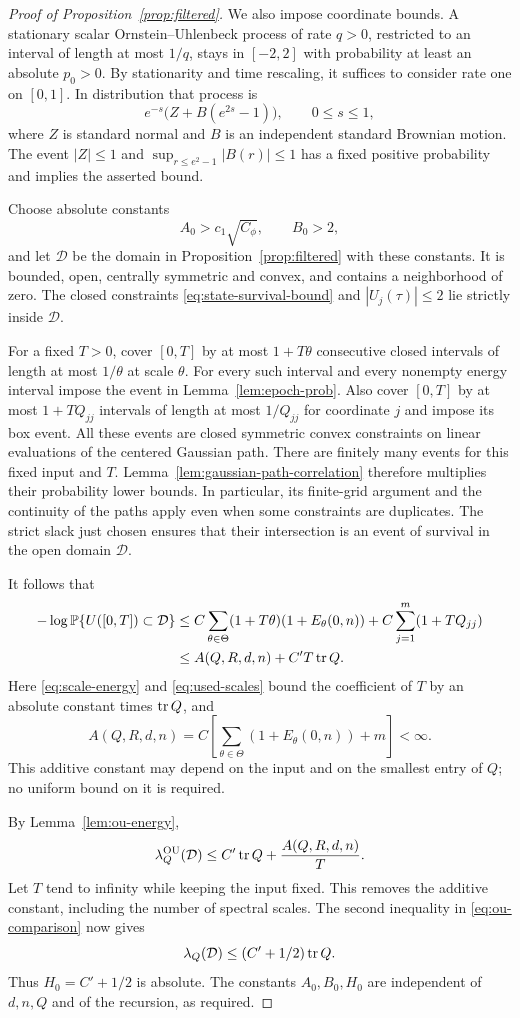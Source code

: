 \begin{proof}[Proof of Proposition~\ref{prop:filtered}]
We also impose coordinate bounds.  A stationary scalar
Ornstein--Uhlenbeck process of rate $q>0$, restricted to an interval of
length at most $1/q$, stays in $[-2,2]$ with probability at least an
absolute $p_0>0$.  By stationarity and time rescaling, it suffices to
consider rate one on $[0,1]$.  In distribution that process is
\[
 e^{-s}\bigl(Z+B(e^{2s}-1)\bigr),\qquad 0\le s\le1,
\]
where $Z$ is standard normal and $B$ is an independent standard Brownian
motion.  The event $|Z|\le1$ and
$\sup_{r\le e^2-1}|B(r)|\le1$ has a fixed positive probability and
implies the asserted bound.

Choose absolute constants
\[
 A_0>c_1\sqrt{C_\phi},\qquad B_0>2,
\]
and let $\mathcal D$ be the domain in Proposition~\ref{prop:filtered}
with these constants.  It is bounded, open, centrally symmetric and
convex, and contains a neighborhood of zero.  The closed constraints
\eqref{eq:state-survival-bound} and $|U_j(\tau)|\le2$ lie strictly inside
$\mathcal D$.

For a fixed $T>0$, cover $[0,T]$ by at most $1+T\theta$ consecutive
closed intervals of length at most $1/\theta$ at scale $\theta$.
For every such interval and every nonempty energy interval impose the
event in Lemma~\ref{lem:epoch-prob}.  Also cover $[0,T]$ by at most
$1+TQ_{jj}$ intervals of length at most $1/Q_{jj}$ for coordinate $j$
and impose its box event.  All these events are closed symmetric convex
constraints on linear evaluations of the centered Gaussian path.
There are finitely many events for this fixed input and $T$.
Lemma~\ref{lem:gaussian-path-correlation} therefore multiplies their
probability lower bounds.  In particular, its finite-grid argument and
the continuity of the paths apply even when some constraints are
duplicates.  The strict slack just chosen ensures that their intersection
is an event of survival in the open domain $\mathcal D$.

It follows that
\begin{align}
 -\log\mathbb P\{U([0,T])\subset\mathcal D\}
 &\le C\sum_{\theta\in\Theta}
       (1+T\theta)(1+E_\theta(0,n))
       +C\sum_{j=1}^m(1+TQ_{jj})\notag\\
 &\le A(Q,R,d,n)+C'T\operatorname{tr} Q.\label{eq:survival-rate-bound}
\end{align}
Here \eqref{eq:scale-energy} and \eqref{eq:used-scales} bound the
coefficient of $T$ by an absolute constant times $\operatorname{tr} Q$, and
\[
 A(Q,R,d,n)
 =C\left[\sum_{\theta\in\Theta}(1+E_\theta(0,n))+m\right]<\infty.
\]
This additive constant may depend on the input and on the smallest
entry of $Q$; no uniform bound on it is required.

By Lemma~\ref{lem:ou-energy},
\[
 \lambda_Q^{\mathrm{OU}}(\mathcal D)
 \le C'\operatorname{tr} Q+\frac{A(Q,R,d,n)}{T}.
\]
Let $T$ tend to infinity while keeping the input fixed.  This removes
the additive constant, including the number of spectral scales.
The second inequality in \eqref{eq:ou-comparison} now gives
\[
 \lambda_Q(\mathcal D)\le(C'+1/2)\operatorname{tr} Q.
\]
Thus $H_0=C'+1/2$ is absolute.  The constants $A_0,B_0,H_0$ are
independent of $d,n,Q$ and of the recursion, as required.
\end{proof}
